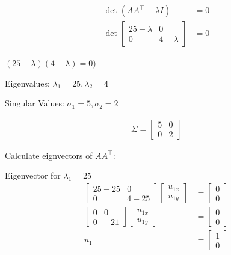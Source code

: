 \documentclass[11pt,letterpaper]{article}
\begin{document}
\begin{enumerate}
\begin{align*}
\det{(AA^\top - \lambda I)} &= 0 \\
\det{\begin{bmatrix}
        25-\lambda & 0 \\
        0 & 4-\lambda
    \end{bmatrix}} &= 0
\end{align*}

\( (25 - \lambda)(4 - \lambda) = 0) \)

Eigenvalues: \( \lambda_1 = 25, \lambda_2 = 4 \)

Singular Values: \( \sigma_1 = 5, \sigma_2 = 2 \)

\begin{align*}
\Sigma = {\begin{bmatrix}
        5 & 0 \\
        0 & 2
    \end{bmatrix}}
\end{align*}

Calculate eignvectors of \( AA^\top \):

Eigenvector for \( \lambda_1 = 25 \)
\begin{align*}
    \begin{bmatrix}
        25-25 & 0 \\
        0 & 4-25
    \end{bmatrix}
    \begin{bmatrix}
        u_{1x} \\ u_{1y}
    \end{bmatrix}
    &= \begin{bmatrix}
        0 \\ 0
    \end{bmatrix} \\
    \begin{bmatrix}
        0 & 0 \\
        0 & -21
    \end{bmatrix}
    \begin{bmatrix}
        u_{1x} \\ u_{1y}
    \end{bmatrix}
    &= \begin{bmatrix}
        0 \\ 0
    \end{bmatrix} \\
    u_1
    &= \begin{bmatrix}
        1 \\ 0
    \end{bmatrix}
\end{align*}


\end{enumerate}
\end{document}
